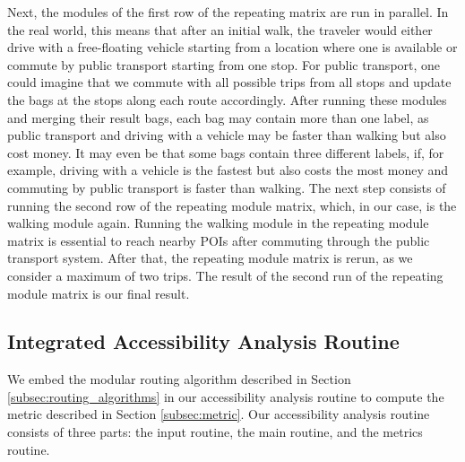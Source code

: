 Next, the modules of the first row of the repeating matrix are run in parallel.
In the real world, this means that after an initial walk, the traveler would either drive with a free-floating vehicle starting from a location where one is available or commute by public transport starting from one stop.
For public transport, one could imagine that we commute with all possible trips from all stops and update the bags at the stops along each route accordingly.
After running these modules and merging their result bags, each bag may contain more than one label, as public transport and driving with a vehicle may be faster than walking but also cost money.
It may even be that some bags contain three different labels, if, for example, driving with a vehicle is the fastest but also costs the most money and commuting by public transport is faster than walking.
The next step consists of running the second row of the repeating module matrix, which, in our case, is the walking module again.
Running the walking module in the repeating module matrix is essential to reach nearby POIs after commuting through the public transport system.
After that, the repeating module matrix is rerun, as we consider a maximum of two trips.
The result of the second run of the repeating module matrix is our final result.



\subsection{Integrated Accessibility Analysis Routine}
\label{subsec:combining}

We embed the modular routing algorithm described in Section \ref{subsec:routing_algorithms} in our accessibility analysis routine to compute the metric described in Section \ref{subsec:metric}.
Our accessibility analysis routine consists of three parts: the input routine, the main routine, and the metrics routine.

